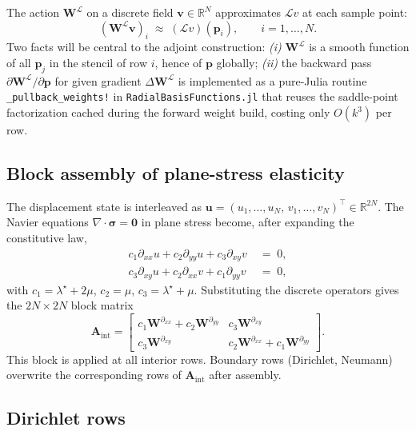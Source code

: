 \documentclass[11pt,a4paper]{article}
\newcommand{\mat}[1]{\mathbf{#1}}
\newcommand{\vect}[1]{\boldsymbol{#1}}
\newcommand{\pts}{\vect{p}}
\newcommand{\reals}{\mathbb{R}}
\begin{document}
The action $\mat W^{\mathcal L}$ on a discrete field
$\vect v \in \reals^N$ approximates $\mathcal L v$ at each sample
point:
\begin{equation}
  (\mat W^{\mathcal L} \vect v)_i
  \;\approx\;
  (\mathcal L v)(\pts_i),
  \qquad i = 1,\ldots,N.
\end{equation}
Two facts will be central to the adjoint construction: \emph{(i)}
$\mat W^{\mathcal L}$ is a smooth function of all $\pts_j$ in the
stencil of row $i$, hence of $\pts$ globally; \emph{(ii)} the
backward pass $\partial\mat W^{\mathcal L}/\partial\pts$ for given
gradient $\Delta\mat W^{\mathcal L}$ is implemented as a pure-Julia
routine \texttt{\_pullback\_weights!} in
\texttt{RadialBasisFunctions.jl} that reuses the saddle-point
factorization cached during the forward weight build, costing only
$O(k^3)$ per row.

\subsection{Block assembly of plane-stress elasticity}

The displacement state is interleaved as
$\vect u = (u_1,\ldots,u_N,\,v_1,\ldots,v_N)^\top \in \reals^{2N}$.
The Navier equations $\nabla\!\cdot\!\vect\sigma = \vect 0$ in plane
stress become, after expanding the constitutive law,
\begin{align}
  c_1 \partial_{xx} u + c_2 \partial_{yy} u + c_3 \partial_{xy} v
    \;&=\; 0, \\
  c_3 \partial_{xy} u + c_2 \partial_{xx} v + c_1 \partial_{yy} v
    \;&=\; 0,
\end{align}
with $c_1 = \lambda^\star + 2\mu$, $c_2 = \mu$, $c_3 = \lambda^\star + \mu$.
Substituting the discrete operators gives the $2N \times 2N$ block
matrix
\begin{equation}
  \mat A_{\text{int}}
  = \begin{bmatrix}
    c_1 \mat W^{\partial_{xx}} + c_2 \mat W^{\partial_{yy}}
    & c_3 \mat W^{\partial_{xy}} \\[2pt]
    c_3 \mat W^{\partial_{xy}}
    & c_2 \mat W^{\partial_{xx}} + c_1 \mat W^{\partial_{yy}}
  \end{bmatrix}.
  \label{eq:A-int}
\end{equation}
This block is applied at all interior rows. Boundary rows
(Dirichlet, Neumann) overwrite the corresponding rows of
$\mat A_{\text{int}}$ after assembly.

\subsection{Dirichlet rows}
\end{document}
